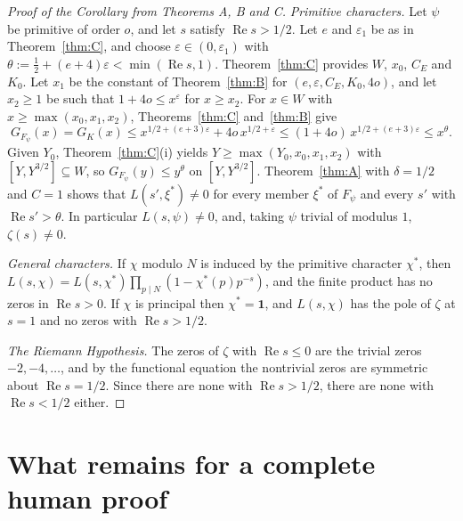 \documentclass[11pt]{amsart}
\newcommand{\eps}{\varepsilon}
\newcommand{\re}{\operatorname{Re}}
\theoremstyle{plain}
\theoremstyle{definition}
\numberwithin{equation}{section}
\begin{document}
\begin{proof}[Proof of the Corollary from Theorems A, B and C]
\emph{Primitive characters.} Let $\psi$ be primitive of order $o$, and let $s$ satisfy
$\re s>1/2$. Let $e$ and $\eps_1$ be as in Theorem~\ref{thm:C}, and choose
$\eps\in(0,\eps_1)$ with $\theta:=\frac12+(e+4)\eps<\min(\re s,1)$. Theorem~\ref{thm:C} provides
$W$, $x_0$, $C_E$ and $K_0$. Let $x_1$ be the constant of Theorem~\ref{thm:B} for
$(e,\eps,C_E,K_0,4o)$, and let $x_2\ge1$ be such that $1+4o\le x^{\eps}$ for $x\ge x_2$. For
$x\in W$ with $x\ge\max(x_0,x_1,x_2)$, Theorems~\ref{thm:C} and~\ref{thm:B} give
\[
G_{F_\psi}(x)=G_K(x)\le x^{1/2+(e+3)\eps}+4o\,x^{1/2+\eps}\le(1+4o)\,x^{1/2+(e+3)\eps}\le x^{\theta}.
\]
Given $Y_0$, Theorem~\ref{thm:C}(i) yields $Y\ge\max(Y_0,x_0,x_1,x_2)$ with $[Y,Y^{3/2}]\subseteq W$, so
$G_{F_\psi}(y)\le y^{\theta}$ on $[Y,Y^{3/2}]$. Theorem~\ref{thm:A} with $\delta=1/2$ and $C=1$ shows
that $L(s',\xi^*)\ne0$ for every member $\xi^*$ of $F_\psi$ and every $s'$ with $\re s'>\theta$. In
particular $L(s,\psi)\neq0$, and, taking $\psi$ trivial of modulus $1$, $\zeta(s)\neq0$.

\emph{General characters.} If $\chi$ modulo $N$ is induced by the primitive character $\chi^*$, then
$L(s,\chi)=L(s,\chi^*)\prod_{p\mid N}(1-\chi^*(p)p^{-s})$, and the finite product has no zeros in
$\re s>0$. If $\chi$ is principal then $\chi^*=\mathbf 1$, and $L(s,\chi)$ has the pole of $\zeta$ at
$s=1$ and no zeros with $\re s>1/2$.

\emph{The Riemann Hypothesis.} The zeros of $\zeta$ with $\re s\le0$ are the trivial zeros
$-2,-4,\dots$, and by the functional equation the nontrivial zeros are symmetric about
$\re s=1/2$. Since there are none with $\re s>1/2$, there are none with $\re s<1/2$ either.
\end{proof}

\section{What remains for a complete human proof}\label{sec:remarks}
\end{document}
